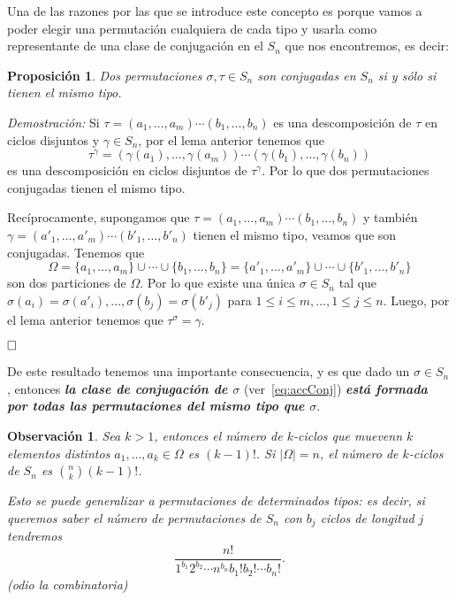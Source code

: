 \documentclass[12pt]{article}
\newtheorem{proposition}[theorem]{Proposición}
\newtheorem{observation}{Observación}[theorem]
\begin{document}
Una de las razones por las que se introduce este concepto es porque vamos a poder elegir una permutación cualquiera de cada tipo y usarla como representante de una clase de conjugación en el $S_{n}$ que nos encontremos, es decir: 

\begin{proposition}Dos permutaciones $\sigma, \tau \in S_{n}$ son conjugadas en $S_{n}$ si y sólo si tienen el mismo tipo.
\end{proposition}
\emph{Demostración: }
Si $\tau =(a_{1}, \ldots, a_{m})\cdots(b_{1}, \ldots, b_{n})$ es una descomposición de $\tau$ en ciclos disjuntos y $\gamma \in S_{n}$, por el lema anterior tenemos que $$\tau^{\gamma}=(\gamma(a_{1}), \ldots, \gamma(a_{m})) \cdots (\gamma(b_{1}), \ldots, \gamma(b_{n}))$$ es una descomposición en ciclos disjuntos de $\tau^{\gamma}$. Por lo que dos permutaciones conjugadas tienen el mismo tipo.

Recíprocamente, supongamos que $\tau =(a_{1}, \ldots, a_{m}) \cdots(b_{1}, \ldots, b_{n})$ y también $\gamma = (a'_{1}, \ldots, a'_{m})\cdots(b'_{1}, \ldots, b'_{n})$ tienen el mismo tipo, veamos que son conjugadas. Tenemos que $$\Omega = \lbrace a_{1}, \ldots, a_{m} \rbrace \cup \cdots \cup \lbrace b_{1}, \ldots, b_{n} \rbrace = \lbrace a'_{1}, \ldots, a'_{m} \rbrace \cup \cdots \cup \lbrace b'_{1}, \ldots, b'_{n} \rbrace$$
son dos particiones de $\Omega$. Por lo que existe una única $\sigma \in S_{n}$ tal que $\sigma(a_{i})=\sigma(a'_{i}), \ldots, \sigma(b_{j})=\sigma(b'_{j})$ para $1\leq i \leq m, \ldots, 1 \leq j \leq n$. Luego, por el lema anterior tenemos que $\tau^{\sigma} = \gamma.$

$\hfill \square$

De este resultado tenemos una importante consecuencia, y es que dado un $\sigma \in S_{n}$, entonces \textbf{\textit{la clase de conjugación de $\sigma$}} (ver~\ref{eq:accConj}) \textbf{\textit{está formada por todas las permutaciones del mismo tipo que $\sigma$}}.

\begin{observation} Sea $k>1$, entonces el número de $k$-ciclos que muevenn $k$ elementos distintos $a_{1}, \ldots, a_{k} \in \Omega$ es $(k-1)!$. Si $|\Omega| = n$, el número de $k$-ciclos de $S_{n}$ es ${n \choose k} (k-1)!$.

Esto se puede generalizar a permutaciones de determinados tipos: es decir, si queremos saber el número de permutaciones de $S_{n}$ con $b_{j}$ ciclos de longitud $j$ tendremos $$ \dfrac{n!}{1^{b_{1}}2^{b_{2}} \cdots n^{b_{n}}b_{1}!b_{2}!\cdots b_{n}!}.$$(odio la combinatoria)
\end{observation}
\end{document}

